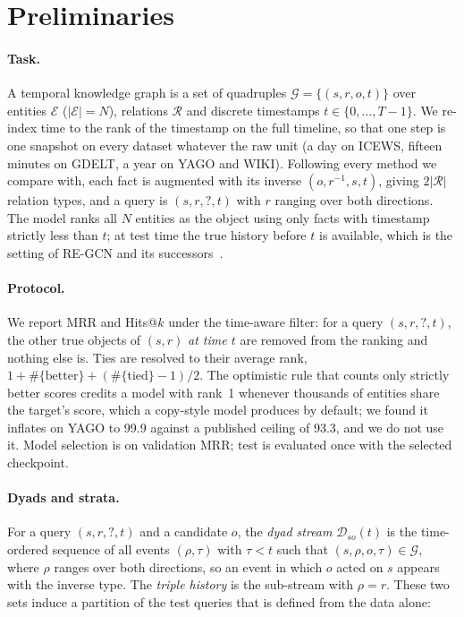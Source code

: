 \section{Preliminaries}
\label{sec:prelim}

\paragraph{Task.}
A temporal knowledge graph is a set of quadruples $\mathcal{G} = \{(s, r, o, t)\}$ over entities $\mathcal{E}$ ($|\mathcal{E}| = N$), relations $\mathcal{R}$ and discrete timestamps $t \in \{0, \dots, T-1\}$. We re-index time to the rank of the timestamp on the full timeline, so that one step is one snapshot on every dataset whatever the raw unit (a day on ICEWS, fifteen minutes on GDELT, a year on YAGO and WIKI). Following every method we compare with, each fact is augmented with its inverse $(o, r^{-1}, s, t)$, giving $2|\mathcal{R}|$ relation types, and a query is $(s, r, ?, t)$ with $r$ ranging over both directions. The model ranks all $N$ entities as the object using only facts with timestamp strictly less than $t$; at test time the true history before $t$ is available, which is the setting of RE-GCN and its successors~\cite{li2021regcn}.

\paragraph{Protocol.}
We report MRR and Hits@$k$ under the time-aware filter: for a query $(s, r, ?, t)$, the other true objects of $(s, r)$ \emph{at time $t$} are removed from the ranking and nothing else is. Ties are resolved to their average rank, $1 + \#\{\text{better}\} + (\#\{\text{tied}\} - 1)/2$. The optimistic rule that counts only strictly better scores credits a model with rank~1 whenever thousands of entities share the target's score, which a copy-style model produces by default; we found it inflates \hten{} on YAGO to 99.9 against a published ceiling of 93.3, and we do not use it. Model selection is on validation MRR; test is evaluated once with the selected checkpoint.

\paragraph{Dyads and strata.}
For a query $(s, r, ?, t)$ and a candidate $o$, the \emph{dyad stream} $\mathcal{D}_{so}(t)$ is the time-ordered sequence of all events $(\rho, \tau)$ with $\tau < t$ such that $(s, \rho, o, \tau) \in \mathcal{G}$, where $\rho$ ranges over both directions, so an event in which $o$ acted on $s$ appears with the inverse type. The \emph{triple history} is the sub-stream with $\rho = r$. These two sets induce a partition of the test queries that is defined from the data alone:


